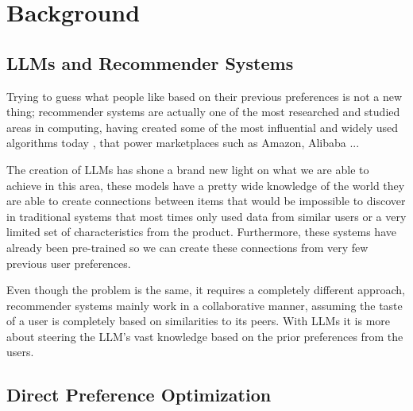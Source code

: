 
\section{Background}
\label{sec:bg}

\subsection{LLMs and Recommender Systems}
\label{sec:bg:llmrec}

Trying to guess what people like based on their previous preferences is not a new thing; recommender systems are actually one of the most researched and studied areas in computing, having created some of the most influential and widely used algorithms today \citep{koren2009matrixfact}, that power marketplaces such as Amazon, Alibaba ...

The creation of LLMs has shone a brand new light on what we are able to achieve in this area, these models have a pretty wide knowledge of the world they are able to create connections between items that would be impossible to discover in traditional systems that most times only used data from similar users or a very limited set of characteristics from the product. Furthermore, these systems have already been pre-trained so we can create these connections from very few previous user preferences.

Even though the problem is the same, it requires a completely different approach, recommender systems mainly work in a collaborative manner, assuming the taste of a user is completely based on similarities to its peers. With LLMs it is more about steering the LLM's vast knowledge based on the prior preferences from the users.

\subsection{Direct Preference Optimization}

